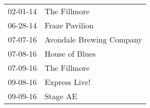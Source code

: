 \begin{supertabular}{p{0.25\columnwidth}p{0.75\columnwidth}}
 02-01-14 &              The Fillmore \\
 06-28-14 &            Fraze Pavilion \\
 07-07-16 &  Avondale Brewing Company \\
 07-08-16 &            House of Blues \\
 07-09-16 &              The Fillmore \\
 09-08-16 &             Express Live! \\
 09-09-16 &                  Stage AE \\
\end{supertabular}
